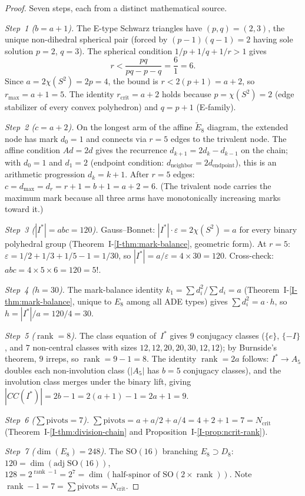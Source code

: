 \begin{proof}
Seven steps, each from a distinct mathematical source.

\emph{Step~1 ($b = a{+}1$).}
The E-type Schwarz triangles have $(p,q) = (2,3)$,
the unique non-dihedral spherical pair
(forced by $(p{-}1)(q{-}1) = 2$ having sole solution $p = 2$, $q = 3$).
The spherical condition $1/p + 1/q + 1/r > 1$ gives
\[
  r < \frac{pq}{pq - p - q} = \frac{6}{1} = 6.
\]
Since $a = 2\chi(S^2) = 2p = 4$, the bound is
$r < 2(p{+}1) = a + 2$, so $r_{\max} = a + 1 = 5$.
The identity $r_{\mathrm{crit}} = a + 2$ holds because
$p = \chi(S^2) = 2$ (edge stabilizer of every convex polyhedron)
and $q = p + 1$ (E-family).

\emph{Step~2 ($c = a{+}2$).}
On the longest arm of the affine $\tilde{E}_8$ diagram,
the extended node has mark $d_0 = 1$ and connects via $r = 5$ edges
to the trivalent node.
The affine condition $Ad = 2d$ gives the recurrence
$d_{k+1} = 2d_k - d_{k-1}$ on the chain;
with $d_0 = 1$ and $d_1 = 2$ (endpoint condition:
$d_{\mathrm{neighbor}} = 2d_{\mathrm{endpoint}}$),
this is an arithmetic progression $d_k = k + 1$.
After $r = 5$ edges: $c = d_{\max} = d_r = r + 1 = b + 1 = a + 2 = 6$.
(The trivalent node carries the maximum mark because all three
arms have monotonically increasing marks toward it.)

\emph{Step~3 ($|I^*| = abc = 120$).}
Gauss--Bonnet: $|I^*| \cdot \varepsilon = 2\chi(S^2) = a$
for every binary polyhedral group
(Theorem~I-\ref{I-thm:mark-balance}, geometric form).
At $r = 5$: $\varepsilon = 1/2 + 1/3 + 1/5 - 1 = 1/30$,
so $|I^*| = a/\varepsilon = 4 \times 30 = 120$.
Cross-check: $abc = 4 \times 5 \times 6 = 120 = 5!$.

\emph{Step~4 ($h = 30$).}
The mark-balance identity $k_1 = \sum d_i^2/\sum d_i = a$
(Theorem~I-\ref{I-thm:mark-balance},
unique to $E_8$ among all ADE types)
gives $\sum d_i^2 = a \cdot h$,
so $h = |I^*|/a = 120/4 = 30$.

\emph{Step~5 ($\operatorname{rank} = 8$).}
The class equation of~$I^*$ gives $9$ conjugacy classes
($\{e\}$, $\{-I\}$, and $7$ non-central classes with sizes
$12, 12, 20, 20, 30, 12, 12$);
by Burnside's theorem, $9$ irreps, so $\operatorname{rank} = 9 - 1 = 8$.
The identity $\operatorname{rank} = 2a$ follows:
$I^* \to A_5$ doubles each non-involution class
($|A_5|$ has $b = 5$ conjugacy classes),
and the involution class merges under the binary lift,
giving $|CC(I^*)| = 2b - 1 = 2(a{+}1) - 1 = 2a + 1 = 9$.

\emph{Step~6 ($\sum\text{pivots} = 7$).}
$\sum\text{pivots} = a + a/2 + a/4 = 4 + 2 + 1 = 7 = N_{\mathrm{crit}}$
(Theorem~I-\ref{I-thm:division-chain}
and Proposition~I-\ref{I-prop:ncrit-rank}).

\emph{Step~7 ($\dim(E_8) = 248$).}
The $\mathrm{SO}(16)$ branching $E_8 \supset D_8$:
$120 = \dim(\mathrm{adj}\;\mathrm{SO}(16))$,
$128 = 2^{\operatorname{rank}-1} = 2^7
= \dim(\text{half-spinor of } \mathrm{SO}(2 \times \operatorname{rank}))$.
Note $\operatorname{rank} - 1 = 7 = \sum\text{pivots} = N_{\mathrm{crit}}$.
\end{proof}

